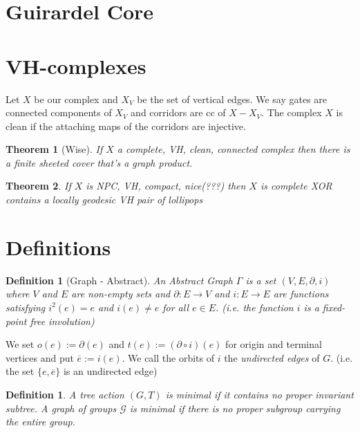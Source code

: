 \documentclass{article}
\theoremstyle{mystyle}
\newtheorem{thm}{Theorem}[section]
\newtheorem{defn}[lem]{Definition}
\theoremstyle{remark}
\begin{document}
\section{Guirardel Core}

\section{VH-complexes}

Let \(X\) be our complex and \(X_{V}\) be the set of vertical edges. We say gates are connected components of \(X_{V}\) and corridors are cc of \(X - X_{V}\). The complex \(X\) is clean if the attaching maps of the corridors are injective.

\begin{thm}[Wise]
	If \(X\) a complete, VH, clean, connected complex then there is a finite sheeted cover that's a graph product.
\end{thm}

\begin{thm}
	If \(X\) is NPC, VH, compact, nice(???) then \(X\) is complete XOR contains a locally geodesic VH pair of lollipops
\end{thm}

\section{Definitions}
\begin{defn}[Graph - Abstract]
	An {\em Abstract Graph} \(\Gamma\) is a set \((V,E, \partial, i)\) where \(V\) and \(E\) are non-empty sets and \(\partial: E \to V\) and \(i: E \to E\) are functions satisfying \(i^2(e)=e\) and \(i(e) \neq e\) for all \(e \in E\). (i.e. the function \(i\) is a fixed-point free involution)
	
\end{defn}

We set \(o(e) := \partial(e)\) and \(t(e) := (\partial\circ i)(e)\) for origin and terminal vertices and put \(\overline{e} := i(e)\). We call the orbits of \(i\) the {\em undirected edges} of \(G\). (i.e. the set \(\{ e, \overline{e}\}\) is an undirected edge) 

\begin{defn}
	A tree action \((G,T)\) is {\em minimal} if it contains no proper invariant subtree. A graph of groups \(\mathcal{G}\) is minimal if there is no proper subgroup carrying the entire group.
	
\end{defn}
\end{document}
